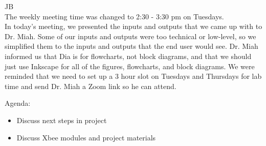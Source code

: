 \documentclass[fontsize=11pt, %
                             paper=letter, %
                             openany, %
                             captions=tableheading,
                             index=totoc,
                             hyperref]{labbook}
\begin{document}
\begin{addmargin}[0cm]{0cm}
JB\\
The weekly meeting time was changed to 2:30 - 3:30 pm on Tuesdays.\\
In today's meeting, we presented the inputs and outputs that we came up with to Dr. Miah. Some of our inputs and outputs were too technical or low-level, so we simplified them to the inputs and outputs that the end user would see. Dr. Miah informed us that Dia is for flowcharts, not block diagrams, and that we should just use Inkscape for all of the figures, flowcharts, and block diagrams. We were reminded that we need to set up a 3 hour slot on Tuesdays and Thursdays for lab time and send Dr. Miah a Zoom link so he can attend.

Agenda:

\begin{itemize}
    \item Discuss next steps in project
    \item Discuss Xbee modules and project materials
\end{itemize}




\end{addmargin}
\end{document}
